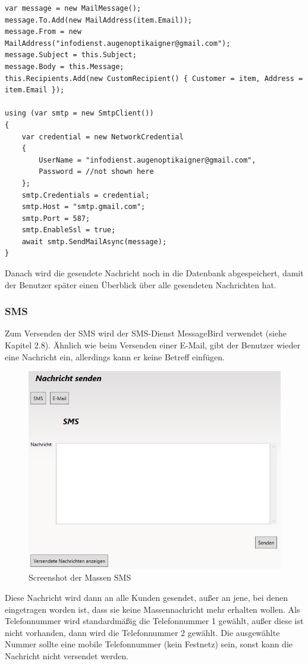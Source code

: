 \begin{lstlisting}
var message = new MailMessage();
message.To.Add(new MailAddress(item.Email));
message.From = new MailAddress("infodienst.augenoptikaigner@gmail.com");
message.Subject = this.Subject;
message.Body = this.Message;
this.Recipients.Add(new CustomRecipient() { Customer = item, Address = item.Email });

using (var smtp = new SmtpClient())
{
	var credential = new NetworkCredential
	{
		UserName = "infodienst.augenoptikaigner@gmail.com",
		Password = //not shown here
	};
	smtp.Credentials = credential;
	smtp.Host = "smtp.gmail.com";
	smtp.Port = 587;
	smtp.EnableSsl = true;
	await smtp.SendMailAsync(message);
}       
\end{lstlisting}
\bigskip
Danach wird die gesendete Nachricht noch in die Datenbank abgespeichert, damit der Benutzer später einen Überblick über alle gesendeten Nachrichten hat.

\subsubsection{SMS}
Zum Versenden der SMS wird der SMS-Dienst MessageBird verwendet (siehe Kapitel 2.8). Ähnlich wie beim Versenden einer E-Mail, gibt der Benutzer wieder eine Nachricht ein, allerdings kann er keine Betreff einfügen.
\begin{figure}[H]
\begin{center}
	\includegraphics[scale=.45]{images/Massensms.png}
\end{center}
	\caption{Screenshot der Massen SMS}
	\label{fig:sample}
\end{figure}
\noindent Diese Nachricht wird dann an alle Kunden gesendet, außer an jene, bei denen eingetragen worden ist, dass sie keine Massennachricht mehr erhalten wollen. Als Telefonnummer wird standardmäßig die Telefonnummer 1 gewählt, außer diese ist nicht vorhanden, dann wird die Telefonnummer 2 gewählt. Die ausgewählte Nummer sollte eine mobile Telefonnummer (kein Festnetz) sein, sonst kann die Nachricht nicht versendet werden.
